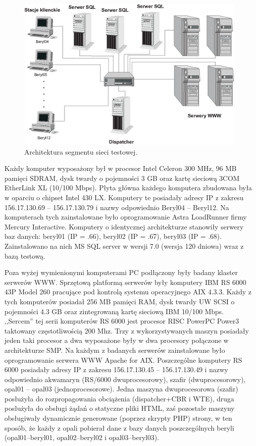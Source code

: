 \begin{figure}[h]
\centering
\includegraphics[width=14cm]{./rysunki/komputerki.eps}
\caption{Architektura segmentu sieci testowej.}
\label{architektura}
\end{figure}
Każdy komputer wyposażony był w procesor Intel 
Celeron 300 MHz, 96 MB pamięci SDRAM, dysk twardy o pojemności 3 GB oraz kartę sieciową 3COM EtherLink XL (10/100 Mbps). 
Płyta główna każdego komputera zbudowana była w oparciu o chipset Intel 430 LX. Komputery te posiadały adresy IP z zakresu 
156.17.130.69 -- 156.17.130.79 i nazwy odpowiednio Beryl04 -- Beryl12. Na komputerach tych zainstalowane było oprogramowanie
Astra LoadRunner firmy Mercury Interactive. Komputery o identycznej architekturze stanowiły serwery baz danych: beryl01 (IP = .66), beryl02 (IP = .67), beryl03 (IP = .68).
Zainstalowano na nich MS SQL server w wersji 7.0 (wersja 120 dniowa) wraz z bazą testową.

Poza wyżej wymienionymi komputerami PC podłączony były badany klaster serwerów WWW. Sprzętową platformą serwerów były 
komputery IBM RS 6000 43P Model 260 pracujące pod kontrolą systemu operacyjnego AIX 4.3.3. Każdy z tych komputerów posiadał 
256 MB pamięci RAM, dysk twardy UW SCSI o pojemności 4.3 GB oraz zintegrowaną kartę sieciową IBM 10/100 Mbps. ,,Sercem'' tej 
serii komputerów RS 6000 jest procesor RISC PowerPC Power3 taktowany częstotliwością 200 Mhz. Trzy z wykorzystywanych maszyn 
posiadały jeden taki procesor a dwa wyposażone były w dwa procesory połączone w architekturze SMP. Na każdym z badanych 
serwerów zainstalowane było oprogramowanie serwera WWW Apache for AIX. Poszczególne komputery RS 6000 posiadały adresy IP z 
zakresu 156.17.130.45 -- 156.17.130.49 i nazwy odpowiednio akwamaryn (RS/6000 dwuprocesorowy), szafir (dwuprocesorowy), 
opal01 -- opal03 (jednoprocesorowe). Jedna maszyna dwuprocesorowa (szafir) posłużyła do 
rozpropagowania obciążenia (dispatcher+CBR i WTE), druga posłużyła do obsługi żądań o statyczne
pliki HTML, zaś pozostałe maszyny obsługiwały dynamicznie generowane (poprzez skrypty PHP) strony,
w ten sposób, że każdy z opali pobierał dane z bazy danych poszczególnych beryli (opal01--beryl01,
 opal02--beryl02 i opal03--beryl03).

